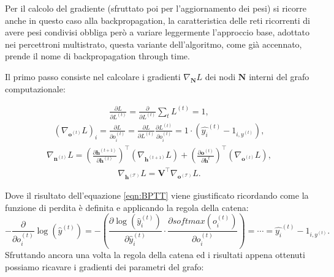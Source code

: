 \documentclass[../../main.tex]{subfiles}
\begin{document}
Per il calcolo del gradiente (sfruttato poi per l'aggiornamento dei pesi) si ricorre anche in questo caso alla backpropagation, la caratteristica delle reti ricorrenti di avere pesi condivisi obbliga però a variare leggermente l'approccio base, adottato nei percettroni multistrato, questa variante dell'algoritmo, come già accennato, prende il nome di backpropagation through time.
 
Il primo passo consiste nel calcolare i gradienti $\nabla_{\boldsymbol{N}}L$ dei nodi $\boldsymbol{N}$ interni del grafo computazionale:
\begin{fleqn}[0cm]
    \begin{align}
        \frac{\partial L}{\partial L ^ {(t)}} = \frac{\partial}{\partial L ^{(t)}} \sum_t L^{(t)} = 1,
    \end{align}
    \begin{align}
        (\nabla_{\boldsymbol{o}^{(t)}}L)_i = \frac{\partial L}{\partial o^{(t)}_i} = \frac{\partial L}{\partial L^{(t)}} \frac{\partial L^{(t)}}{\partial o^{(t)}_i} = 1 \cdot (\hat{y_i}^{(t)} - 1_{i,y^{(t)}}),
        \label{eqn:BPTT}
    \end{align}
    \begin{align}
        \nabla_{\boldsymbol{n}^{(t)}}L = \left(\frac{\partial \boldsymbol{h}^{(t+1)}}{\partial \boldsymbol{h}^{(t)}}\right)^\top (\nabla_{\boldsymbol{h}^{(t+1)}}L) + \left(\frac{\partial \boldsymbol{o}^{(t)}}{\partial \boldsymbol{h}^{t}}\right)^\top (\nabla_{\boldsymbol{o}^{(t)}}L),
    \end{align}
    \begin{align}
        \nabla_{\boldsymbol{h}^{(\mathcal{T})}}L = \boldsymbol{V}^\top \nabla_{\boldsymbol{o}^{(\mathcal{T})}} L .
    \end{align}
\end{fleqn}
Dove il risultato dell'equazione \ref{eqn:BPTT} viene giustificato ricordando come la funzione di perdita è definita e applicando la regola della catena:
\[- \frac{\partial}{\partial o_i^{(t)}} \log(\hat{y}^{(t)}) = - \left(\frac{\partial \log(\hat{y}_i^{(t)})}{\partial \hat{y}_i^{(t)}} \cdot\frac{\partial softmax(o_i^{(t)})}{\partial o_i^{(t)}}\right) = \cdots = \hat{y_i}^{(t)} - 1_{i,y^{(t)}}.\]
Sfruttando ancora una volta la regola della catena ed i risultati appena ottenuti possiamo ricavare i gradienti dei parametri del grafo:
\end{document}
